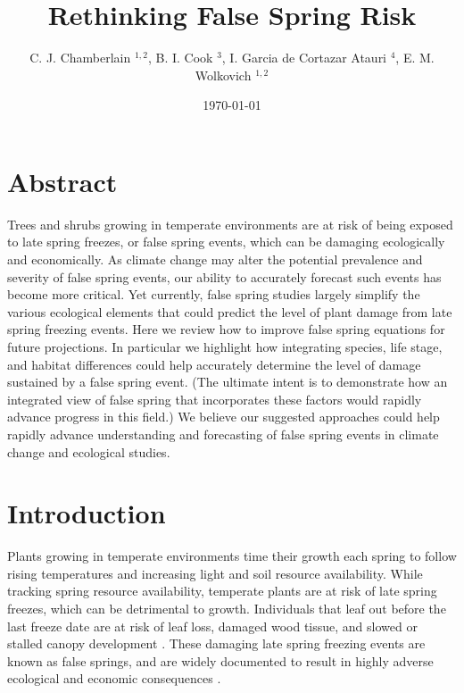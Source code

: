 \documentclass{article}\usepackage[]{graphicx}\usepackage[]{color}
\begin{document}
\title{Rethinking False Spring Risk}
\author{C. J. Chamberlain $^{1,2}$, B. I. Cook $^{3}$, I. Garcia de Cortazar Atauri $^{4}$, E. M. Wolkovich $^{1,2}$}
\date{\today}
\maketitle 
 

\renewcommand{\thetable}{\arabic{table}}
\renewcommand{\thefigure}{\arabic{figure}}
\renewcommand{\labelitemi}{$-$}



\section{Abstract}
Trees and shrubs growing in temperate environments are at risk of being exposed to late spring freezes, or false spring events, which can be damaging ecologically and economically. As climate change may alter the potential prevalence and severity of false spring events, our ability to accurately forecast such events has become more critical. Yet currently, false spring studies largely simplify the various ecological elements that could predict the level of plant damage from late spring freezing events. Here we review how to improve false spring equations for future projections. In particular we highlight how integrating species, life stage, and habitat differences could help accurately determine the level of damage sustained by a false spring event. (The ultimate intent is to demonstrate how an integrated view of false spring that incorporates these factors would rapidly advance progress in this field.) We believe our suggested approaches could help rapidly advance understanding and forecasting of false spring events in climate change and ecological studies.

\section{Introduction}

Plants growing in temperate environments time their growth each spring to follow rising temperatures and increasing light and soil resource availability. While tracking spring resource availability, temperate plants are at risk of late spring freezes, which can be detrimental to growth. Individuals that leaf out before the last freeze date are at risk of leaf loss, damaged wood tissue, and slowed or stalled canopy development \citep{Gu2008, Hufkens2012}. These damaging late spring freezing events are known as false springs, and are widely documented to result in highly adverse ecological and economic consequences \citep{Knudson2012, Ault2013}.
\end{document}
